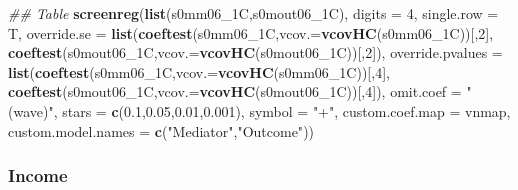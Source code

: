 \documentclass[
]{article}
\newenvironment{Shaded}{\begin{snugshade}}{\end{snugshade}}
\newcommand{\CommentTok}[1]{\textcolor[rgb]{0.56,0.35,0.01}{\textit{#1}}}
\newcommand{\DataTypeTok}[1]{\textcolor[rgb]{0.13,0.29,0.53}{#1}}
\newcommand{\DecValTok}[1]{\textcolor[rgb]{0.00,0.00,0.81}{#1}}
\newcommand{\FloatTok}[1]{\textcolor[rgb]{0.00,0.00,0.81}{#1}}
\newcommand{\KeywordTok}[1]{\textcolor[rgb]{0.13,0.29,0.53}{\textbf{#1}}}
\newcommand{\NormalTok}[1]{#1}
\newcommand{\StringTok}[1]{\textcolor[rgb]{0.31,0.60,0.02}{#1}}
\begin{document}
\begin{Shaded}
\begin{Highlighting}[]
\CommentTok{## Table}
\KeywordTok{screenreg}\NormalTok{(}\KeywordTok{list}\NormalTok{(s0mm06_1C,s0mout06_1C), }\DataTypeTok{digits =} \DecValTok{4}\NormalTok{, }\DataTypeTok{single.row =}\NormalTok{ T,}
          \DataTypeTok{override.se =} \KeywordTok{list}\NormalTok{(}\KeywordTok{coeftest}\NormalTok{(s0mm06_1C,}\DataTypeTok{vcov.=}\KeywordTok{vcovHC}\NormalTok{(s0mm06_1C))[,}\DecValTok{2}\NormalTok{],}
                             \KeywordTok{coeftest}\NormalTok{(s0mout06_1C,}\DataTypeTok{vcov.=}\KeywordTok{vcovHC}\NormalTok{(s0mout06_1C))[,}\DecValTok{2}\NormalTok{]),}
          \DataTypeTok{override.pvalues =} \KeywordTok{list}\NormalTok{(}\KeywordTok{coeftest}\NormalTok{(s0mm06_1C,}\DataTypeTok{vcov.=}\KeywordTok{vcovHC}\NormalTok{(s0mm06_1C))[,}\DecValTok{4}\NormalTok{],}
                                  \KeywordTok{coeftest}\NormalTok{(s0mout06_1C,}\DataTypeTok{vcov.=}\KeywordTok{vcovHC}\NormalTok{(s0mout06_1C))[,}\DecValTok{4}\NormalTok{]),}
          \DataTypeTok{omit.coef =} \StringTok{"(wave)"}\NormalTok{, }\DataTypeTok{stars =} \KeywordTok{c}\NormalTok{(}\FloatTok{0.1}\NormalTok{,}\FloatTok{0.05}\NormalTok{,}\FloatTok{0.01}\NormalTok{,}\FloatTok{0.001}\NormalTok{), }\DataTypeTok{symbol =} \StringTok{"+"}\NormalTok{,}
          \DataTypeTok{custom.coef.map =}\NormalTok{ vnmap, }
          \DataTypeTok{custom.model.names =} \KeywordTok{c}\NormalTok{(}\StringTok{"Mediator"}\NormalTok{,}\StringTok{"Outcome"}\NormalTok{))}
\end{Highlighting}
\end{Shaded}

\hypertarget{income}{%
\subsubsection{Income}\label{income}}
\end{document}

